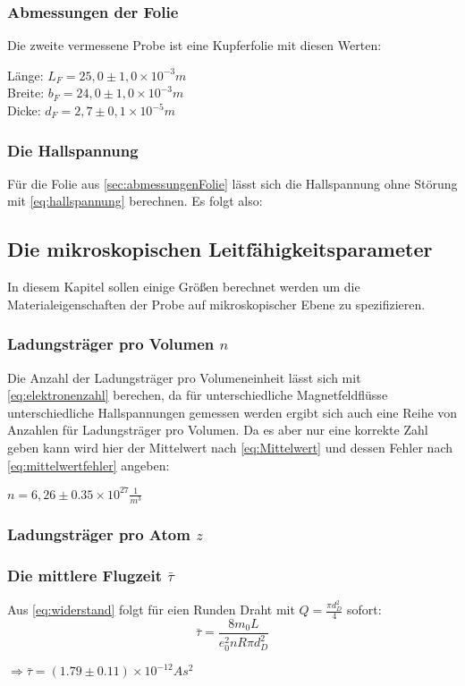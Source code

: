 \subsubsection{Abmessungen der Folie}
\label{sec:abmessungenFolie}
Die zweite vermessene Probe ist eine Kupferfolie mit diesen Werten:
\begin{center}
    Länge: $L_F=25,0\pm1,0\times 10^{-3} m$\\
    Breite: $b_F=24,0\pm1,0\times 10^{-3} m$\\
    Dicke: $d_F=2,7\pm0,1\times 10^{-5} m$
\end{center} 
\subsubsection{Die Hallspannung}
Für die Folie aus \autoref{sec:abmessungenFolie} lässt sich die Hallspannung ohne Störung mit 
\autoref{eq:hallspannung} berechnen. Es folgt also:


\subsection{Die mikroskopischen Leitfähigkeitsparameter}
\label{sec:leitfaehigkeitsparameter}
In diesem Kapitel sollen einige Größen berechnet werden um die Materialeigenschaften der Probe
auf mikroskopischer Ebene zu spezifizieren.
\subsubsection{Ladungsträger pro Volumen $n$}
\label{sec:ladungstraegerVolumen}
Die Anzahl der Ladungsträger pro Volumeneinheit lässt sich mit \autoref{eq:elektronenzahl} berechen, da 
für unterschiedliche Magnetfeldflüsse unterschiedliche Hallspannungen gemessen werden ergibt sich auch
eine Reihe von Anzahlen für Ladungsträger pro Volumen. Da es aber nur eine korrekte Zahl geben kann wird hier
der Mittelwert nach \autoref{eq:Mittelwert} und dessen Fehler nach \autoref{eq:mittelwertfehler} angeben:
\begin{center}
    $n=6,26\pm0.35 \times 10^{27} \frac{1}{m^3}$
\end{center}
\subsubsection{Ladungsträger pro Atom $z$}
\label{sec:ladungstraegerAtom}
\subsubsection{Die mittlere Flugzeit $\bar{\tau}$}
\label{sec:flugzeit}
Aus \autoref{eq:widerstand} folgt für eien Runden Draht mit $Q=\frac{\pi d_D^2}{4}$ sofort:
\begin{equation}
    \label{eq:tau}
    \bar{\tau}=\frac{8m_0L}{e_0^2n R \pi d_{D}^2}
\end{equation}
\begin{center}
    $\Rightarrow \bar{\tau}=(1.79\pm0.11) \times10^{-12} As^2$
\end{center}


